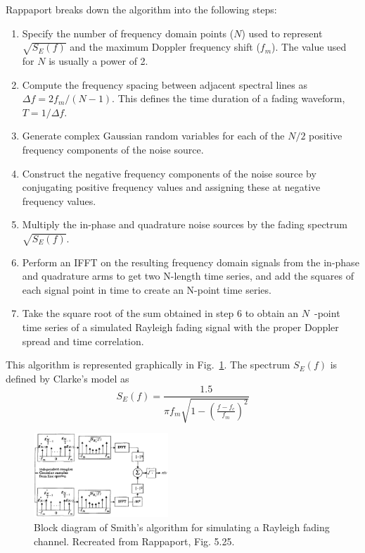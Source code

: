 \documentclass[journal]{IEEEtran}
\begin{document}
Rappaport breaks down the algorithm into the following steps:
\begin{enumerate}
\item Specify the number of frequency domain points ($N$) used to represent $\sqrt{S_{E}(f)}$ and the maximum Doppler frequency shift ($f_m$). The value used for $N$ is usually a power of 2. 
\item Compute the frequency spacing between adjacent spectral lines as $\Delta f = 2f_m / (N-1)$. This defines the time duration of a fading waveform, $T = 1/\Delta f$.
\item Generate complex Gaussian random variables for each of the $N/2$ positive frequency components of the noise source.
\item Construct the negative frequency components of the noise source by conjugating positive frequency values and assigning these at negative frequency values.
\item Multiply the in-phase and quadrature noise sources by the fading spectrum $\sqrt{S_{E}(f)}$.
\item Perform an IFFT on the resulting frequency domain signals from the in-phase and quadrature arms to get two N-length time series, and add the squares of each signal point in time to create an N-point time series.
\item  Take the square root of the sum obtained in step 6 to obtain an $N$~-point time series of a simulated Rayleigh fading signal with the proper Doppler spread and time correlation.
\end{enumerate}

This algorithm is represented graphically in Fig.~\ref{fig:SmithAlgorithm}. The spectrum $S_{E}(f)$ is defined by Clarke's model as
\begin{equation}
S_{E}(f) = \frac{1.5}{\pi f_m \sqrt{1 - \left(\frac{f - f_c}{f_m}\right)^2}}
\end{equation}

\begin{figure}
    \centering
    \includegraphics[width = 0.45\textwidth]{SmithAlgorithm}
    \caption{Block diagram of Smith's algorithm for simulating a Rayleigh fading channel. Recreated from Rappaport, Fig. 5.25.}
    \label{fig:SmithAlgorithm}
\end{figure}
\end{document}
